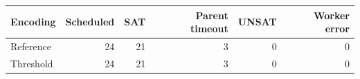 \begin{tabular}{lrrrrr}
\toprule
Encoding & Scheduled & SAT & Parent timeout & UNSAT & Worker error \\
\midrule
Reference & 24 & 21 & 3 & 0 & 0 \\
Threshold & 24 & 21 & 3 & 0 & 0 \\
\bottomrule
\end{tabular}
